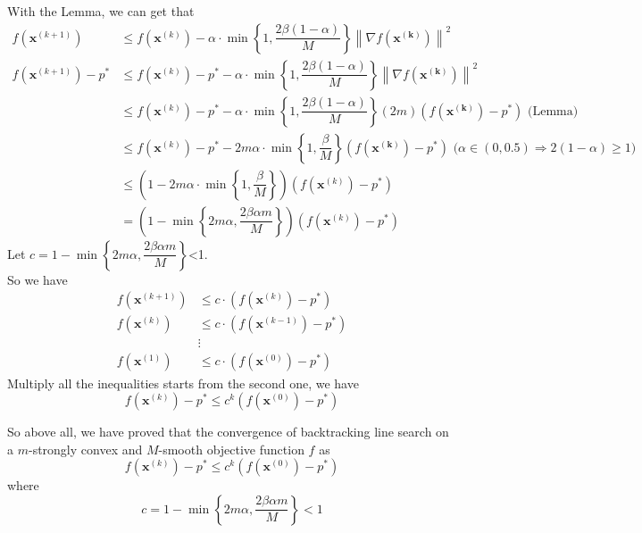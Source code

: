 With the Lemma, we can get that
\begin{align*}
    f\left(\mathbf{x}^{(k+1)}\right) &\leq f\left(\mathbf{x}^{(k)}\right) - \alpha\cdot\min\left\{1,\dfrac{2\beta(1-\alpha)}{M}\right\}\left\|\nabla f\left(\mathbf{x^{(k)}}\right)\right\|^2\\
    f\left(\mathbf{x}^{(k+1)}\right)-p^* &\leq f\left(\mathbf{x}^{(k)}\right) - p^* - \alpha\cdot\min\left\{1,\dfrac{2\beta(1-\alpha)}{M}\right\}\left\|\nabla f\left(\mathbf{x^{(k)}}\right)\right\|^2\\
    &\leq f\left(\mathbf{x}^{(k)}\right) - p^* - \alpha\cdot\min\left\{1,\dfrac{2\beta(1-\alpha)}{M}\right\}(2m)\left(f\left(\mathbf{x^{(k)}}\right)-p^*\right) \text{\ \ \ \ \ \ (Lemma)} \\
    &\leq f\left(\mathbf{x}^{(k)}\right) - p^* - 2m\alpha\cdot\min\left\{1,\dfrac{\beta}{M}\right\}\left(f\left(\mathbf{x^{(k)}}\right)-p^*\right) \text{\ \ \ \ \ \ \ \ \ \ \ \ ($\alpha\in(0,0.5)\Rightarrow 2(1-\alpha)\geq 1$)} \\
    &\leq \left(1 - 2m\alpha\cdot\min\left\{1,\dfrac{\beta}{M}\right\}\right)\left(f\left(\mathbf{x}^{(k)}\right)-p^*\right) \\
    &= \left(1 - \min\left\{2m\alpha,\dfrac{2\beta\alpha m}{M}\right\}\right)\left(f\left(\mathbf{x}^{(k)}\right)-p^*\right)
\end{align*}
Let $c=1 - \min\left\{2m\alpha,\dfrac{2\beta\alpha m}{M}\right\}$<1.\\
So we have
\begin{align*}
    f\left(\mathbf{x}^{(k+1)}\right) &\leq c\cdot \left(f\left(\mathbf{x}^{(k)}\right)-p^*\right) \\
    f\left(\mathbf{x}^{(k)}\right) &\leq c\cdot \left(f\left(\mathbf{x}^{(k-1)}\right)-p^*\right) \\
    &\vdots \\
    f\left(\mathbf{x}^{(1)}\right) &\leq c\cdot \left(f\left(\mathbf{x}^{(0)}\right)-p^*\right)
\end{align*}
Multiply all the inequalities starts from the second one, we have
$$f\left(\mathbf{x}^{(k)}\right)-p^* \leq c^k\left(f\left(\mathbf{x}^{(0)}\right)-p^*\right)$$

So above all, we have proved that the convergence of backtracking line search on a $m$-strongly convex and $M$-smooth objective function $f$ as
$$f\left(\mathbf{x}^{(k)}\right)-p^* \leq c^k\left(f\left(\mathbf{x}^{(0)}\right)-p^*\right)$$
where
$$c=1 - \min\left\{2m\alpha,\dfrac{2\beta\alpha m}{M}\right\}<1$$